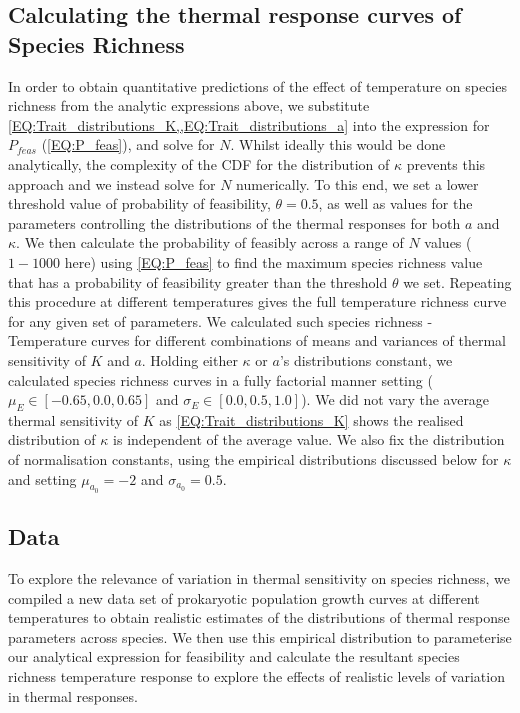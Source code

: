 \documentclass{article}
\begin{document}
\subsection*{Calculating the thermal response curves of Species Richness} \label{SEC:Temp_SP_num}

In order to obtain quantitative predictions of the effect of temperature on species richness from the analytic expressions above, we substitute \cref{EQ:Trait_distributions_K,,EQ:Trait_distributions_a} into the expression for $P_{feas}$ (\cref{EQ:P_feas}), and solve for $N$. Whilst ideally this would be done analytically, the complexity of the CDF for the distribution of $\kappa$ prevents this approach and we instead solve for $N$ numerically. To this end, we set a lower threshold value of probability of feasibility, $\theta = 0.5$, as well as values for the parameters controlling the distributions of the thermal responses for both $a$ and $\kappa$. We then calculate the probability of feasibly across a range of $N$ values ($1 - 1000$ here) using \cref{EQ:P_feas} to find the maximum species richness value that has a probability of feasibility greater than the threshold $\theta$ we set. Repeating this procedure at different temperatures gives the full temperature richness curve for any given set of parameters. We calculated such species richness - Temperature curves for different combinations of means and variances of thermal sensitivity of $K$ and $a$. Holding either $\kappa$ or $a$'s distributions constant, we calculated species richness curves in a fully factorial manner setting ($\mu_{E} \in [-0.65, 0.0, 0.65]$ and $\sigma_{E} \in [0.0, 0.5, 1.0]$). We did not vary the average thermal sensitivity of $K$ as \cref{EQ:Trait_distributions_K} shows the realised distribution of $\kappa$ is independent of the average value. We also fix the distribution of normalisation constants, using the empirical distributions discussed below for $\kappa$ and setting $\mu_{a_0} = -2$ and $\sigma_{a_0} = 0.5$.

\subsection*{Data} \label{SEC:DATA}

To explore the relevance of variation in thermal sensitivity on species richness, we compiled a new data set of prokaryotic population growth curves at different temperatures to obtain realistic estimates of the distributions of thermal response parameters across species. We then use this empirical distribution to parameterise our analytical expression for feasibility and calculate the resultant species richness temperature response to explore the effects of  realistic levels of variation in thermal responses. 
\end{document}

